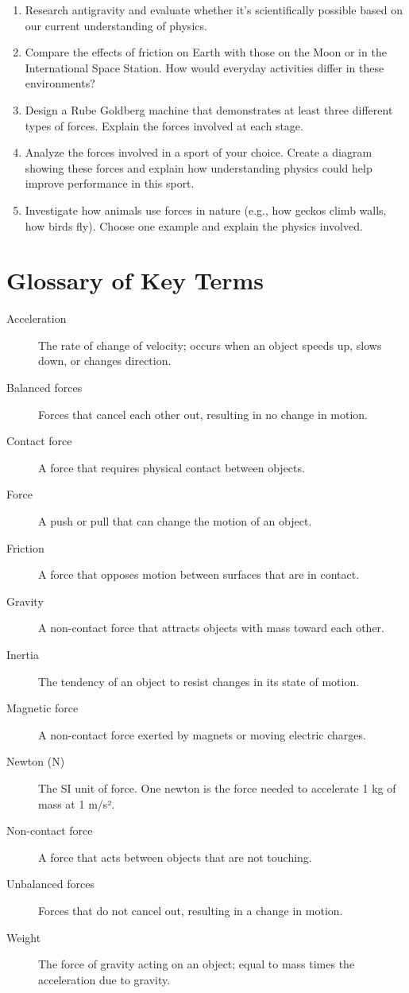 \documentclass[justified,notoc]{tufte-book}
\newenvironment{tieredquestions}[1]{%
    \begin{tcolorbox}[colback=note!30,colframe=note!50,title=\textbf{Practice Questions - #1}]
}{%
    \end{tcolorbox}
}
\begin{document}
\begin{tieredquestions}{Level 3 - Extension and Analysis}
\begin{enumerate}
    \item Research antigravity and evaluate whether it's scientifically possible based on our current understanding of physics.
    \item Compare the effects of friction on Earth with those on the Moon or in the International Space Station. How would everyday activities differ in these environments?
    \item Design a Rube Goldberg machine that demonstrates at least three different types of forces. Explain the forces involved at each stage.
    \item Analyze the forces involved in a sport of your choice. Create a diagram showing these forces and explain how understanding physics could help improve performance in this sport.
    \item Investigate how animals use forces in nature (e.g., how geckos climb walls, how birds fly). Choose one example and explain the physics involved.
\end{enumerate}
\end{tieredquestions}

\section{Glossary of Key Terms}

\begin{description}
    \item[Acceleration] The rate of change of velocity; occurs when an object speeds up, slows down, or changes direction.
    \item[Balanced forces] Forces that cancel each other out, resulting in no change in motion.
    \item[Contact force] A force that requires physical contact between objects.
    \item[Force] A push or pull that can change the motion of an object.
    \item[Friction] A force that opposes motion between surfaces that are in contact.
    \item[Gravity] A non-contact force that attracts objects with mass toward each other.
    \item[Inertia] The tendency of an object to resist changes in its state of motion.
    \item[Magnetic force] A non-contact force exerted by magnets or moving electric charges.
    \item[Newton (N)] The SI unit of force. One newton is the force needed to accelerate 1 kg of mass at 1 m/s².
    \item[Non-contact force] A force that acts between objects that are not touching.
    \item[Unbalanced forces] Forces that do not cancel out, resulting in a change in motion.
    \item[Weight] The force of gravity acting on an object; equal to mass times the acceleration due to gravity.
\end{description}
\end{document}
